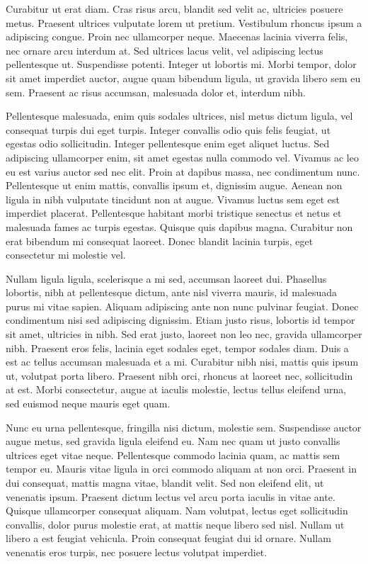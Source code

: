 \documentclass[2pt,a4paper,twoside ]{article}
\begin{document}
\begin{multicols}{2}
Curabitur ut erat diam. Cras risus arcu, blandit sed velit ac, ultricies posuere metus. Praesent ultrices vulputate lorem ut pretium. Vestibulum rhoncus ipsum a adipiscing congue. Proin nec ullamcorper neque. Maecenas lacinia viverra felis, nec ornare arcu interdum at. Sed ultrices lacus velit, vel adipiscing lectus pellentesque ut. Suspendisse potenti. Integer ut lobortis mi. Morbi tempor, dolor sit amet imperdiet auctor, augue quam bibendum ligula, ut gravida libero sem eu sem. Praesent ac risus accumsan, malesuada dolor et, interdum nibh.

Pellentesque malesuada, enim quis sodales ultrices, nisl metus dictum ligula, vel consequat turpis dui eget turpis. Integer convallis odio quis felis feugiat, ut egestas odio sollicitudin. Integer pellentesque enim eget aliquet luctus. Sed adipiscing ullamcorper enim, sit amet egestas nulla commodo vel. Vivamus ac leo eu est varius auctor sed nec elit. Proin at dapibus massa, nec condimentum nunc. Pellentesque ut enim mattis, convallis ipsum et, dignissim augue. Aenean non ligula in nibh vulputate tincidunt non at augue. Vivamus luctus sem eget est imperdiet placerat. Pellentesque habitant morbi tristique senectus et netus et malesuada fames ac turpis egestas. Quisque quis dapibus magna. Curabitur non erat bibendum mi consequat laoreet. Donec blandit lacinia turpis, eget consectetur mi molestie vel.

Nullam ligula ligula, scelerisque a mi sed, accumsan laoreet dui. Phasellus lobortis, nibh at pellentesque dictum, ante nisl viverra mauris, id malesuada purus mi vitae sapien. Aliquam adipiscing ante non nunc pulvinar feugiat. Donec condimentum nisi sed adipiscing dignissim. Etiam justo risus, lobortis id tempor sit amet, ultricies in nibh. Sed erat justo, laoreet non leo nec, gravida ullamcorper nibh. Praesent eros felis, lacinia eget sodales eget, tempor sodales diam. Duis a est ac tellus accumsan malesuada et a mi. Curabitur nibh nisi, mattis quis ipsum ut, volutpat porta libero. Praesent nibh orci, rhoncus at laoreet nec, sollicitudin at est. Morbi consectetur, augue at iaculis molestie, lectus tellus eleifend urna, sed euismod neque mauris eget quam.

Nunc eu urna pellentesque, fringilla nisi dictum, molestie sem. Suspendisse auctor augue metus, sed gravida ligula eleifend eu. Nam nec quam ut justo convallis ultrices eget vitae neque. Pellentesque commodo lacinia quam, ac mattis sem tempor eu. Mauris vitae ligula in orci commodo aliquam at non orci. Praesent in dui consequat, mattis magna vitae, blandit velit. Sed non eleifend elit, ut venenatis ipsum. Praesent dictum lectus vel arcu porta iaculis in vitae ante. Quisque ullamcorper consequat aliquam. Nam volutpat, lectus eget sollicitudin convallis, dolor purus molestie erat, at mattis neque libero sed nisl. Nullam ut libero a est feugiat vehicula. Proin consequat feugiat dui id ornare. Nullam venenatis eros turpis, nec posuere lectus volutpat imperdiet.


\end{multicols}
\end{document}
